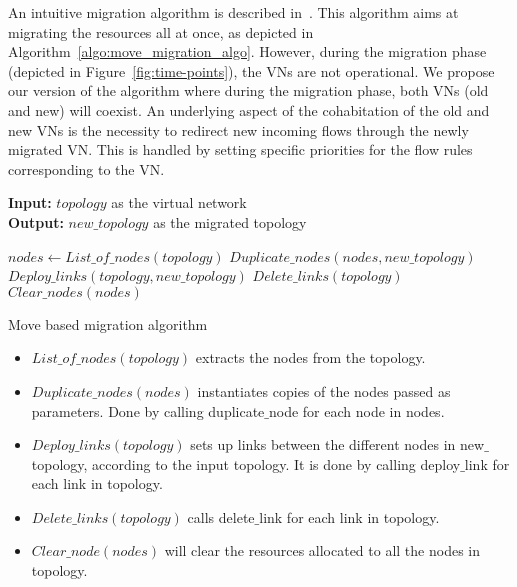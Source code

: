 An intuitive migration algorithm is described in~\cite{Lime-Ghorbani2014}. 
This algorithm aims at migrating the resources all at once, as depicted in Algorithm~\ref{algo:move_migration_algo}.
However, during the migration phase (depicted in Figure~\ref{fig:time-points}), the VNs are not operational.
We propose our version of the algorithm where during the migration phase, both VNs (old and new) will coexist.
An underlying aspect of the cohabitation of the old and new VNs is the necessity to redirect new incoming flows through the newly migrated VN.
This is handled by setting specific priorities for the flow rules corresponding to the VN.
\begin{algorithm}
\textbf{Input: }$topology$ as the virtual network\\
\textbf{Output: } $new\_topology$ as the migrated topology
\begin{algorithmic}[1]
\State $nodes \gets List\_of\_nodes(topology)$
\State $Duplicate\_nodes(nodes,new\_topology)$
\State $Deploy\_links(topology,new\_topology)$
\State $Delete\_links(topology)$
\State $Clear\_nodes(nodes)$
\caption{Move based migration algorithm}
\label{algo:move_migration_algo}
\end{algorithmic}
\end{algorithm}
\begin{itemize}
\item $List\_of\_nodes(topology)$ extracts the nodes from the topology.
\item $Duplicate\_nodes(nodes)$ instantiates copies of the nodes passed as parameters. Done by calling duplicate$\_$node for each node in nodes.
\item $Deploy\_links(topology)$ sets up links between the different nodes in new$\_$topology, according to the input topology.
It is done by calling deploy$\_$link for each link in topology.
\item $Delete\_links(topology)$ calls delete$\_$link for each link in topology.
\item $Clear\_node(nodes)$ will clear the resources allocated to all the nodes in topology.
\end{itemize}

